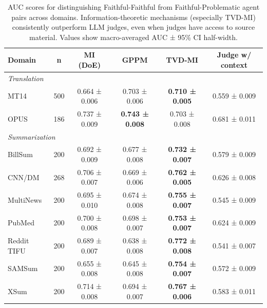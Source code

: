 \begin{table}[t]
\centering
\caption{AUC scores for distinguishing Faithful-Faithful from Faithful-Problematic agent pairs across domains. Information-theoretic mechanisms (especially TVD-MI) consistently outperform LLM judges, even when judges have access to source material. Values show macro-averaged AUC ± 95\% CI half-width.}
\label{tab:auc_results}
\begin{tabular}{lccccc}
\toprule
\textbf{Domain} & \textbf{n} & \textbf{MI (DoE)} & \textbf{GPPM} & \textbf{TVD-MI} & \textbf{Judge w/ context} \\
\midrule
\multicolumn{6}{l}{\textit{Translation}} \\
MT14 & 500 & 0.664 ± 0.006 & 0.703 ± 0.006 & \textbf{0.710 ± 0.005} & 0.559 ± 0.009 \\
OPUS & 186 & 0.737 ± 0.009 & \textbf{0.743 ± 0.008} & 0.703 ± 0.008 & 0.681 ± 0.011 \\
\midrule
\multicolumn{6}{l}{\textit{Summarization}} \\
BillSum & 200 & 0.692 ± 0.009 & 0.677 ± 0.008 & \textbf{0.732 ± 0.007} & 0.579 ± 0.009 \\
CNN/DM & 268 & 0.706 ± 0.007 & 0.669 ± 0.006 & \textbf{0.762 ± 0.005} & 0.626 ± 0.008 \\
MultiNews & 200 & 0.695 ± 0.010 & 0.674 ± 0.008 & \textbf{0.755 ± 0.007} & 0.545 ± 0.009 \\
PubMed & 200 & 0.700 ± 0.008 & 0.698 ± 0.007 & \textbf{0.753 ± 0.007} & 0.624 ± 0.009 \\
Reddit TIFU & 200 & 0.689 ± 0.007 & 0.638 ± 0.008 & \textbf{0.772 ± 0.008} & 0.541 ± 0.007 \\
SAMSum & 200 & 0.655 ± 0.008 & 0.645 ± 0.008 & \textbf{0.754 ± 0.007} & 0.572 ± 0.009 \\
XSum & 200 & 0.714 ± 0.008 & 0.694 ± 0.007 & \textbf{0.767 ± 0.006} & 0.583 ± 0.011 \\
\midrule
\bottomrule
\end{tabular}
\end{table}